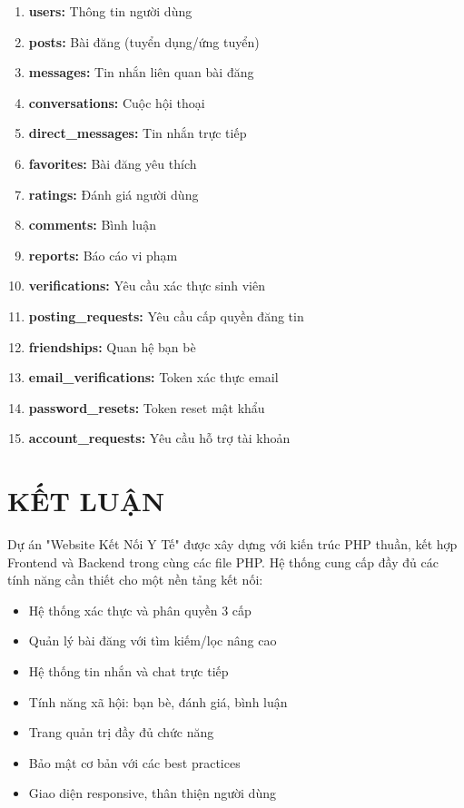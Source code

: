 \documentclass[a4paper,12pt]{article}
\begin{document}
\begin{enumerate}
    \item \textbf{users:} Thông tin người dùng
    \item \textbf{posts:} Bài đăng (tuyển dụng/ứng tuyển)
    \item \textbf{messages:} Tin nhắn liên quan bài đăng
    \item \textbf{conversations:} Cuộc hội thoại
    \item \textbf{direct\_messages:} Tin nhắn trực tiếp
    \item \textbf{favorites:} Bài đăng yêu thích
    \item \textbf{ratings:} Đánh giá người dùng
    \item \textbf{comments:} Bình luận
    \item \textbf{reports:} Báo cáo vi phạm
    \item \textbf{verifications:} Yêu cầu xác thực sinh viên
    \item \textbf{posting\_requests:} Yêu cầu cấp quyền đăng tin
    \item \textbf{friendships:} Quan hệ bạn bè
    \item \textbf{email\_verifications:} Token xác thực email
    \item \textbf{password\_resets:} Token reset mật khẩu
    \item \textbf{account\_requests:} Yêu cầu hỗ trợ tài khoản
\end{enumerate}

\section{KẾT LUẬN}

Dự án "Website Kết Nối Y Tế" được xây dựng với kiến trúc PHP thuần, kết hợp Frontend và Backend trong cùng các file PHP. Hệ thống cung cấp đầy đủ các tính năng cần thiết cho một nền tảng kết nối:

\begin{itemize}
    \item Hệ thống xác thực và phân quyền 3 cấp
    \item Quản lý bài đăng với tìm kiếm/lọc nâng cao
    \item Hệ thống tin nhắn và chat trực tiếp
    \item Tính năng xã hội: bạn bè, đánh giá, bình luận
    \item Trang quản trị đầy đủ chức năng
    \item Bảo mật cơ bản với các best practices
    \item Giao diện responsive, thân thiện người dùng
\end{itemize}
\end{document}
